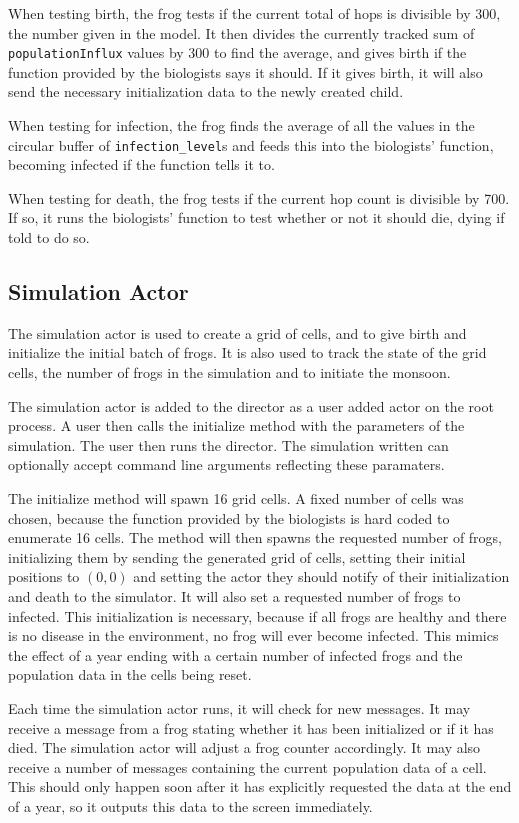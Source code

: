\documentclass[12pt,a4paper]{article}
\newcommand{\term}[1]{\texttt{#1}}
\begin{document}
When testing birth, the frog tests if the current total of hops is
divisible by 300, the number given in the model.
It then divides the currently tracked sum of \term{populationInflux}
values by 300 to find the average, and gives birth if the
function provided by the biologists says it should.
If it gives birth, it will also send the necessary initialization
data to the newly created child.

When testing for infection, the frog finds the average of all the
values in the circular buffer of \term{infection\_level}s and
feeds this into the biologists' function, becoming infected if
the function tells it to.

When testing for death, the frog tests if the current hop count is
divisible by 700.
If so, it runs the biologists' function to test whether or not it should
die, dying if told to do so.

\subsection{Simulation Actor}
The simulation actor is used to create a grid of cells, and to
give birth and initialize the initial batch of frogs.
It is also used to track the state of the grid cells,
the number of frogs in the simulation
and to initiate the monsoon.

The simulation actor is added to the director as a user added actor
on the root process.
A user then calls the initialize method with the parameters of the simulation.
The user then runs the director.
The simulation written can optionally accept command line arguments
reflecting these paramaters.

The initialize method will spawn 16 grid cells.
A fixed number of cells was chosen, because the function provided
by the biologists is hard coded to enumerate 16 cells.
The method will then spawns the requested number of frogs,
initializing them by sending the generated grid of cells,
setting their initial positions to $(0,0)$
and setting the actor they should notify of their initialization and
death to the simulator.
It will also set a requested number of frogs to infected.
This initialization is necessary, because if all frogs are healthy
and there is no disease in the environment, no frog will ever
become infected.
This mimics the effect of a year ending with a certain number of infected
frogs and the population data in the cells being reset.

Each time the simulation actor runs, it will check for new messages.
It may receive a message from a frog stating whether it has been initialized
or if it has died.
The simulation actor will adjust a frog counter accordingly.
It may also receive a number of messages containing the current population
data of a cell.
This should only happen soon after it has explicitly requested the data
at the end of a year, so it outputs this data to the screen immediately.
\end{document}
